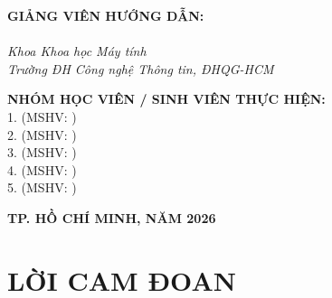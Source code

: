 \documentclass[11pt,journal,onecolumn]{IEEEtran}
\begin{document}
\begin{titlepage}
\begin{center}
    \vspace{2.0cm}
    \begin{minipage}[t]{0.48\textwidth}
        \textbf{GIẢNG VIÊN HƯỚNG DẪN:}\\
        \vspace{0.3cm}
        \underline{\hspace{6.0cm}}\\
        \textit{Khoa Khoa học Máy tính}\\
        \textit{Trường ĐH Công nghệ Thông tin, ĐHQG-HCM}
    \end{minipage}
    \hfill
    \begin{minipage}[t]{0.48\textwidth}
        \textbf{NHÓM HỌC VIÊN / SINH VIÊN THỰC HIỆN:}\\
        \vspace{0.2cm}
        1. \underline{\hspace{4.2cm}} (MSHV: \underline{\hspace{1.5cm}})\\
        2. \underline{\hspace{4.2cm}} (MSHV: \underline{\hspace{1.5cm}})\\
        3. \underline{\hspace{4.2cm}} (MSHV: \underline{\hspace{1.5cm}})\\
        4. \underline{\hspace{4.2cm}} (MSHV: \underline{\hspace{1.5cm}})\\
        5. \underline{\hspace{4.2cm}} (MSHV: \underline{\hspace{1.5cm}})
    \end{minipage}
    
    \vfill
    {\large \textbf{TP. HỒ CHÍ MINH, NĂM 2026}\par}
\end{center}
\end{titlepage}

\newpage
{}

\section*{LỜI CAM ĐOAN}
\end{document}
